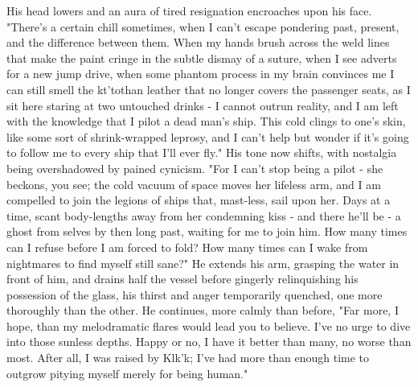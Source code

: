 His head lowers and an aura of tired resignation encroaches upon his
face.  "There's a certain chill sometimes, when I can't escape
pondering past, present, and the difference between them.  When my
hands brush across the weld lines that make the paint cringe in the
subtle dismay of a suture, when I see adverts for a new jump drive,
when some phantom process in my brain convinces me I can still smell
the kt'tothan leather that no longer covers the passenger seats, as I
sit here staring at two untouched drinks - I cannot outrun reality,
and I am left with the knowledge that I pilot a dead man's ship.  This
cold clings to one's skin, like some sort of shrink-wrapped leprosy,
and I can't help but wonder if it's going to follow me to every ship
that I'll ever fly." His tone now shifts, with nostalgia being
overshadowed by pained cynicism. "For I can't stop being a pilot - she
beckons, you see; the cold vacuum of space moves her lifeless arm, and
I am compelled to join the legions of ships that, mast-less, sail upon
her.  Days at a time, scant body-lengths away from her condemning kiss
- and there he'll be - a ghost from selves by then long past, waiting
for me to join him.  How many times can I refuse before I am forced to
fold?  How many times can I wake from nightmares to find myself still
sane?" He extends his arm, grasping the water in front of him, and
drains half the vessel before gingerly relinquishing his possession of
the glass, his thirst and anger temporarily quenched, one more
thoroughly than the other. He continues, more calmly than before, "Far
more, I hope, than my melodramatic flares would lead you to
believe. I've no urge to dive into those sunless depths.  Happy or no,
I have it better than many, no worse than most. After all, I was
raised by Klk'k; I've had more than enough time to outgrow pitying
myself merely for being human."

